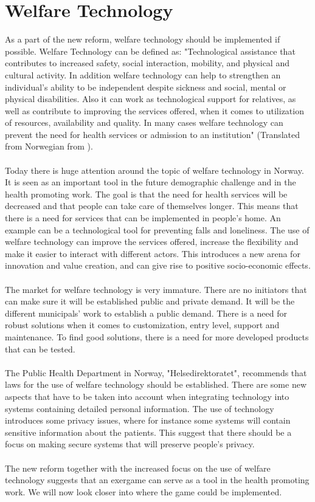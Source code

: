 \section{Welfare Technology}
As a part of the new reform, welfare technology should be implemented if possible. Welfare Technology can be defined as: "Technological assistance that contributes to increased safety, social interaction, mobility, and physical and cultural activity. In addition welfare technology can help to strengthen an individual’s ability to be independent despite sickness and social, mental or physical disabilities. Also it can work as technological support for relatives, as well as contribute to improving the services offered, when it comes to utilization of resources, availability and quality. In many cases welfare technology can prevent the need for health services or admission to an institution" (Translated from Norwegian from \cite{welfare}).\\ \\
Today there is huge attention around the topic of welfare technology in Norway. It is seen as an important tool in the future demographic challenge and in the health promoting work.  The goal is that the need for health services will be decreased and that people can take care of themselves longer. This means that there is a need for services that can be implemented in people’s home. An example can be a technological tool for preventing falls and loneliness.  The use of welfare technology can improve the services offered, increase the flexibility and make it easier to interact with different actors. This introduces a new arena for innovation and value creation, and can give rise to positive socio-economic effects. \\ \\
The market for welfare technology is very immature. There are no initiators that can make sure it will be established public and private demand. It will be the different municipals' work to establish a public demand. There is a need for robust solutions when it comes to customization, entry level, support and maintenance. To find good solutions, there is a need for more developed products that can be tested.\cite{welfare} \\ \\
The Public Health Department in Norway, "Helsedirektoratet", recommends that laws for the use of welfare technology should be established. There are some new aspects that have to be taken into account when integrating technology into systems containing detailed personal information. The use of technology introduces some privacy issues, where for instance some systems will contain  sensitive information about the patients. This suggest that there should be a focus on making secure systems that will preserve people’s privacy.\cite{welfare} \\ \\
The new reform together with the increased focus on the use of welfare technology suggests that an exergame can serve as a tool in the health promoting work. We will now look closer into where the game could be implemented.

